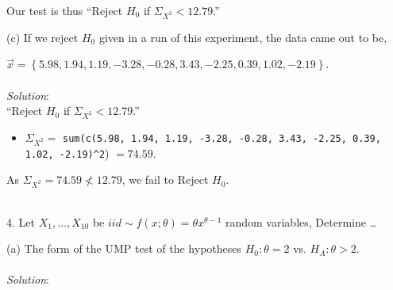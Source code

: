 \documentclass[12pt]{article}
\newcommand{\XB}{\color{black}}
\newcommand{\XBB}{\color{blue}}
\newcommand{\ds}{\displaystyle}
\begin{document}
\noindent
Our test is thus ``Reject $ H_{0} $ if $ \Sigma_{X^{2}} < 12.79 $.'' \\

\vspace{2.5mm}

(c) If we reject $ H_{0} $ given in a run of this experiment, the data came out to be,

$ \overrightarrow{x}  = \left\{ 5.98, 1.94, 1.19, -3.28, -0.28, 3.43, -2.25, 0.39, 1.02, -2.19 \right\} $. \\
\vspace{2.5mm} \\
\textit{Solution}:
\vspace{2.5mm} \\

\noindent
``Reject $ H_{0} $ if $ \Sigma_{X^{2}} < 12.79 $.''

\begin{itemize}
    \item $ \ds \Sigma_{X^{2}} = $ {\XBB \texttt{sum(c(5.98, 1.94, 1.19, -3.28, -0.28, 3.43, -2.25, 0.39, 1.02, -2.19)}\verb|^|\texttt{2})} $ = 74.59 $.
\end{itemize}
As $ \Sigma_{X^{2}} = 74.59 \nless 12.79 $, we fail to Reject $ H_{0} $. \\

\vspace{2.5mm}

\newpage
\XBB\hrulefill\XB \\

4. Let $ X_{1}, \dots , X_{10} $ be $ iid \sim f(x; \theta) = \theta x^{\theta - 1} $ random variables, Determine \dots \\

\XBB\hrulefill\XB
\vspace{5mm}

(a) The form of the UMP test of the hypotheses $ H_{0} : \theta = 2 $ vs. $ H_{A} : \theta > 2 $. \\
\vspace{2.5mm} \\
\textit{Solution}:
\vspace{2.5mm} \\
\end{document}
